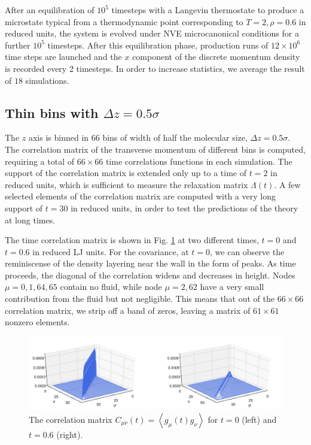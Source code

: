 \documentclass[b5paper,openright,10pt]{book}
\newcommand{\llangle}{\left\langle}
\newcommand{\rrangle}{\right\rangle}
\begin{document}
After an equilibration of $10^5$ timesteps with a Langevin thermostate
to   produce  a   microstate  typical   from  a   thermodynamic  point
corresponding  to  $T=2,\rho=0.6$ in  reduced  units,  the system  is
evolved  under  NVE microcanonical  conditions  for  a further  $10^5$
timesteps.   After  this  equilibration   phase,  production  runs  of
$12\times 10^6$ time  steps are launched and the $x$  component of the
discrete momentum density is recorded  every 2 timesteps.  In order to
increase statistics, we average the result of $18$ simulations.


\subsection{Thin bins with $\Delta z = 0.5\sigma$}
\label{Sec:ThinBins}
The $z$  axis is binned  in $66$ bins of  width of half  the molecular
size, $\Delta z=0.5\sigma$.  The  correlation matrix of the transverse
momentum of different bins is computed, requiring a total of $66\times
66$ time correlations  functions  in each  simulation.   
The support of  the correlation matrix  is extended only  up to a  time of
$t=2$ in reduced units, which  is sufficient to measure the relaxation
matrix $\Lambda(t)$.   A  few  selected  elements of  the  correlation  matrix  are
computed with a very long support of $t=30$ in reduced units, in order
to test the predictions of the theory at long times.

The time correlation  matrix is shown in  Fig.  \ref{fig:Ct-matrix-WALLS-66nodes} at
two different  times, $t=0$ and  $t=0.6$ in  reduced LJ units.   For the
covariance,  at $t=0$,  we can observe the  reminiscense  of the  density
layering near  the wall in the  form of peaks.  As  time proceeds, the
diagonal of  the correlation  widens and  decreases in  height.  Nodes
$\mu=0,1,64,65$ contain  no fluid, while  node $\mu=2,62$ have  a very
small  contribution  from  the  fluid but not negligible.  This means  that  out  of  the
$66\times66$ correlation matrix, we strip off a band of zeros, leaving
a matrix of $61\times61$ nonzero elements.

\begin{figure}[h!]
\centering
\includegraphics[width=\linewidth]{Ct-matrix-WALLS-66nodes}
\caption[Correlation matrix $C(t)$ at $t=0$ and $t=0.6$ for a confined fluid - Thin bins]{The   correlation    matrix   $C_{\mu\nu}(t)=\llangle
g_{\mu}(t)  g_\nu\rrangle$ for  $t=0$ (left) and $t=0.6$ (right).}
\label{fig:Ct-matrix-WALLS-66nodes}
\end{figure}
\end{document}
